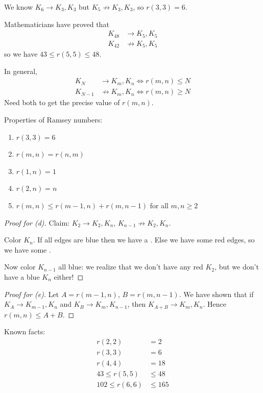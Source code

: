 \documentclass[12pt]{article}
\begin{document}
\eg We know $K_6\to K_3,K_3$ but $K_5\not\to K_3,K_3$, so $r(3,3)=6$.

\eg Mathematicians have proved that \begin{align*}
    K_{48} &\to K_5,K_5\\
    K_{42} &\not\to K_5,K_5
\end{align*}
so we have $43\leq r(5,5)\leq 48$.

\rmk In general, \begin{align*}
    K_N&\to K_m, K_n \iff r(m,n)\leq N\\
    K_{N-1} &\not\to K_m,K_n \iff r(m,n)\geq N
\end{align*}
Need both to get the precise value of $r(m,n)$.

\begin{proposition} Properties of Ramsey numbers:
\begin{enumerate}[label=(\alph*)]
    \item $r(3,3)=6$ 
    \item $r(m,n) = r(n,m)$
    \item $r(1,n)=1$
    \item $r(2,n)=n$
    \item $r(m,n)\leq r(m-1,n)+r(m,n-1)$ for all $m,n\geq2$
\end{enumerate}
\begin{proof}[Proof for (d)]
    Claim: $K_2\to K_2,K_n$, $K_{n-1}\not\to K_2,K_n$.
    
    Color $K_n$. If all edges are blue then we have a . Else we have some red edges, so we have some .

    Now color $K_{n-1}$ all blue: we realize that we don't have any red $K_2$, but we don't have a blue $K_n$ either!
\end{proof}
\begin{proof}[Proof for (e)]
    Let $A=r(m-1,n)$, $B=r(m,n-1)$. We have shown that if $K_A\to K_{m-1},K_n$ and $K_B\to K_{m},K_{n-1}$, then $K_{A+B}\to K_m, K_n$. Hence $r(m,n)\leq A+B$.
\end{proof}
\end{proposition}

Known facts:
\begin{align*}
    r(2,2) &=2\\
    r(3,3) &=6\\
    r(4,4) &=18\\
    43\leq r(5,5)&\leq 48\\
    102\leq r(6,6)&\leq 165
\end{align*}
\end{document}
